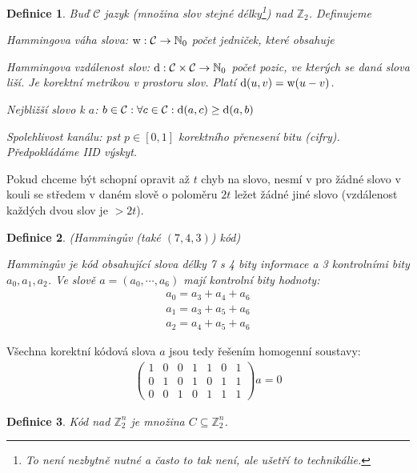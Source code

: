 \documentclass[a4paper,10pt,titlepage]{article} \usepackage[utf8]{inputenc}
\newtheorem{define}{Definice}
\begin{document}
\begin{define}
Buď $\mathcal{C}$ jazyk (množina slov stejné délky\footnote{To není nezbytně nutné a často to tak není, ale ušetří to technikálie.}) nad $\mathbb{Z}_2$. Definujeme

Hammingova váha slova: $\textup{w}: \mathcal{C} \rightarrow \mathbb{N}_0$ počet jedniček, které obsahuje

Hammingova vzdálenost slov: $\textup{d}: \mathcal{C}\times\mathcal{C} \rightarrow \mathbb{N}_0$ počet pozic, ve kterých se daná slova liší. Je korektní metrikou v prostoru slov. Platí $\textup{d}(u, v) = \textup{w}(u - v)$.

Nejbližší slovo k $a$: $b \in \mathcal{C}: \forall c \in \mathcal{C}: \textup{d}(a, c) \geq \textup{d}(a, b)$

Spolehlivost kanálu: pst $p \in [0,1]$ korektního přenesení bitu (cifry). Předpokládáme IID výskyt.
\end{define}

Pokud chceme být schopní opravit až $t$ chyb na slovo, nesmí v pro žádné slovo v kouli se středem v daném slově o poloměru $2t$ ležet žádné jiné slovo (vzdálenost každých dvou slov je $> 2t$).


\begin{define}
(Hammingův (také $(7, 4, 3)$) kód)

Hammingův je kód obsahující slova délky 7 s 4 bity informace a 3 kontrolními bity $a_0, a_1, a_2$. Ve slově $a = (a_0, \cdots, a_6)$ mají kontrolní bity hodnoty:
\begin{align*}
a_0 = a_3 + a_4 + a_6 \\
a_1 = a_3 + a_5 + a_6 \\
a_2 = a_4 + a_5 + a_6
\end{align*}
\end{define}

Všechna korektní kódová slova $a$ jsou tedy řešením homogenní soustavy:
\begin{align*}
\begin{pmatrix}
1  & 0 & 0 &    1 & 1 & 0 & 1 \\
0  & 1 & 0 &    1 & 0 & 1 & 1 \\
0  & 0 & 1 &    0 & 1 & 1 & 1
\end{pmatrix}a=0
\end{align*}

\begin{define}
Kód nad $\mathbb{Z}^n_2$ je množina $C \subseteq \mathbb{Z}^n_2$.
\end{define}
\end{document}
